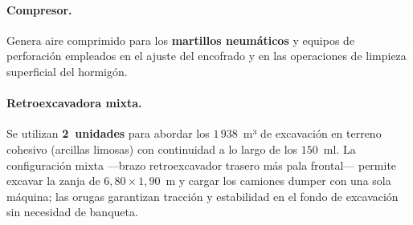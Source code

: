 \paragraph{Compresor.}
Genera aire comprimido para los \textbf{martillos neumáticos} y equipos de
perforación empleados en el ajuste del encofrado y en las operaciones de
limpieza superficial del hormigón.

\begin{table}[H]
  \centering
  \caption{Maquinaria principal prevista}
  \label{tab:maquinaria}
\end{table}

\paragraph{Retroexcavadora mixta.}
Se utilizan \textbf{2~unidades} para abordar los $1\,938$~m³ de excavación en
terreno cohesivo (arcillas limosas) con continuidad a lo largo de los $150$~ml.
La configuración mixta —brazo retroexcavador trasero más pala frontal— permite
excavar la zanja de $6{,}80 \times 1{,}90$~m y cargar los camiones dumper con una
sola máquina; las orugas garantizan tracción y estabilidad en el fondo de
excavación sin necesidad de banqueta.

